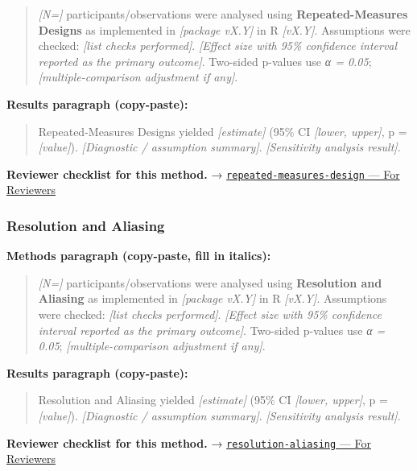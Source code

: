 \documentclass[
]{article}
\begin{document}
\begin{quote}
\emph{{[}N={]}} participants/observations were analysed using
\textbf{Repeated-Measures Designs} as implemented in \emph{{[}package
vX.Y{]}} in R \emph{{[}vX.Y{]}}. Assumptions were checked: \emph{{[}list
checks performed{]}}. \emph{{[}Effect size with 95\% confidence interval
reported as the primary outcome{]}}. Two-sided p-values use \emph{α =
0.05}; \emph{{[}multiple-comparison adjustment if any{]}}.
\end{quote}

\textbf{Results paragraph (copy-paste):}

\begin{quote}
Repeated-Measures Designs yielded \emph{{[}estimate{]}} (95\% CI
\emph{{[}lower, upper{]}}, p = \emph{{[}value{]}}). \emph{{[}Diagnostic
/ assumption summary{]}}. \emph{{[}Sensitivity analysis result{]}}.
\end{quote}

\textbf{Reviewer checklist for this method.} →
\href{../chapters/16-design/repeated-measures-design.Rmd\#for-reviewers}{\texttt{repeated-measures-design}
--- For Reviewers}

\subsubsection{Resolution and Aliasing}\label{resolution-and-aliasing}

\textbf{Methods paragraph (copy-paste, fill in italics):}

\begin{quote}
\emph{{[}N={]}} participants/observations were analysed using
\textbf{Resolution and Aliasing} as implemented in \emph{{[}package
vX.Y{]}} in R \emph{{[}vX.Y{]}}. Assumptions were checked: \emph{{[}list
checks performed{]}}. \emph{{[}Effect size with 95\% confidence interval
reported as the primary outcome{]}}. Two-sided p-values use \emph{α =
0.05}; \emph{{[}multiple-comparison adjustment if any{]}}.
\end{quote}

\textbf{Results paragraph (copy-paste):}

\begin{quote}
Resolution and Aliasing yielded \emph{{[}estimate{]}} (95\% CI
\emph{{[}lower, upper{]}}, p = \emph{{[}value{]}}). \emph{{[}Diagnostic
/ assumption summary{]}}. \emph{{[}Sensitivity analysis result{]}}.
\end{quote}

\textbf{Reviewer checklist for this method.} →
\href{../chapters/16-design/resolution-aliasing.Rmd\#for-reviewers}{\texttt{resolution-aliasing}
--- For Reviewers}
\end{document}

